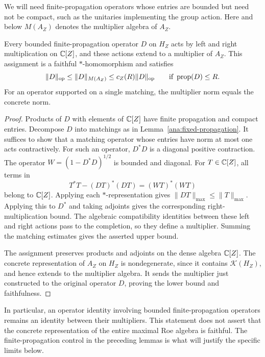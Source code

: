 We will need finite-propagation operators whose entries are bounded but
need not be compact, such as the unitaries implementing the group action.
Here and below $M(A_Z)$ denotes the multiplier algebra of $A_Z$.

\begin{lemma}
\label{ana:multipliers}
Every bounded finite-propagation operator $D$ on $H_Z$ acts by left and
right multiplication on $\mathbb C[Z]$, and these actions extend to a multiplier
of $A_Z$.  This assignment is a faithful $*$-homomorphism and satisfies
\[
 \|D\|_{\mathrm{op}}\leq \|D\|_{M(A_Z)}
 \leq c_Z(R)\|D\|_{\mathrm{op}}
 \qquad\text{if }\operatorname{prop}(D)\leq R.
\]
For an operator supported on a single matching, the multiplier norm equals
the concrete norm.
\end{lemma}

\begin{proof}
Products of $D$ with elements of $\mathbb C[Z]$ have finite propagation and compact
entries.  Decompose $D$ into matchings as in
Lemma~\ref{ana:fixed-propagation}.  It suffices to show that a matching
operator whose entries have norm at most one acts contractively.
For such an operator, $D^*D$ is a diagonal positive contraction.  The
operator $W=(1-D^*D)^{1/2}$ is bounded and diagonal.  For $T\in\mathbb C[Z]$,
all terms in
\[
 T^*T-(DT)^*(DT)=(WT)^*(WT)
\]
belong to $\mathbb C[Z]$.  Applying each $*$-representation gives
$\|DT\|_{\max}\leq\|T\|_{\max}$.  Applying this to $D^*$ and taking
adjoints gives the corresponding right-multiplication bound.  The
algebraic compatibility identities between these left and right actions
pass to the completion, so they define a multiplier.  Summing the
matching estimates gives the asserted upper bound.

The assignment preserves products and adjoints on the dense algebra
$\mathbb C[Z]$.  The concrete representation of $A_Z$ on $H_Z$ is nondegenerate,
since it contains $\mathcal K(H_Z)$, and hence extends to the multiplier
algebra.  It sends the multiplier just constructed to the original
operator $D$, proving the lower bound and faithfulness.
\end{proof}

In particular, an operator identity involving bounded finite-propagation
operators remains an identity between their multipliers.  This statement
does not assert that the concrete representation of the entire maximal
Roe algebra is faithful.  The finite-propagation control in the preceding
lemmas is what will justify the specific limits below.

